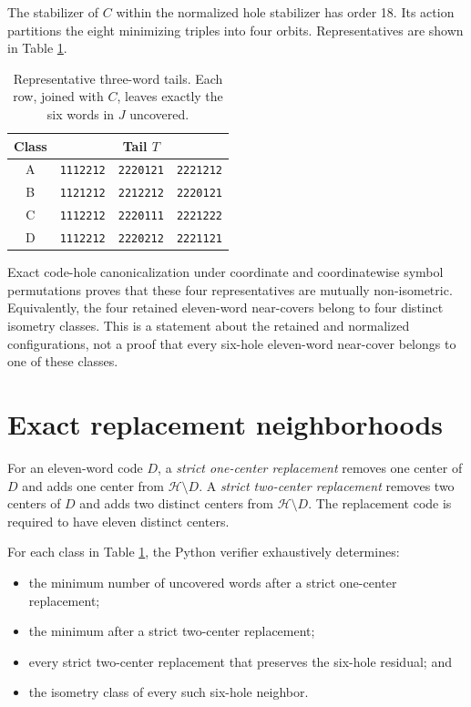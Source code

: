 \documentclass[11pt]{article}
\newcommand{\Hspace}{\mathcal{H}}
\newcommand{\codeword}[1]{\texttt{#1}}
\begin{document}
The stabilizer of \(C\) within the normalized hole stabilizer has order
18.  Its action partitions the eight minimizing triples into four
orbits.  Representatives are shown in Table \ref{tab:tails}.

\begin{table}[htbp]
\centering
\caption{Representative three-word tails.  Each row, joined with \(C\),
leaves exactly the six words in \(J\) uncovered.}
\label{tab:tails}
\begin{tabular}{c@{\qquad}lll}
\toprule
Class & \multicolumn{3}{c}{Tail \(T\)}\\
\midrule
A & \codeword{1112212} & \codeword{2220121} & \codeword{2221212}\\
B & \codeword{1121212} & \codeword{2212212} & \codeword{2220121}\\
C & \codeword{1112212} & \codeword{2220111} & \codeword{2221222}\\
D & \codeword{1112212} & \codeword{2220212} & \codeword{2221121}\\
\bottomrule
\end{tabular}
\end{table}

Exact code-hole canonicalization under coordinate and coordinatewise
symbol permutations proves that these four representatives are mutually
non-isometric.  Equivalently, the four retained eleven-word near-covers
belong to four distinct isometry classes.  This is a statement about the
retained and normalized configurations, not a proof that every
six-hole eleven-word near-cover belongs to one of these classes.

\section{Exact replacement neighborhoods}

For an eleven-word code \(D\), a \emph{strict one-center replacement}
removes one center of \(D\) and adds one center from
\(\Hspace\setminus D\).  A \emph{strict two-center replacement} removes
two centers of \(D\) and adds two distinct centers from
\(\Hspace\setminus D\).  The replacement code is required to have
eleven distinct centers.

For each class in Table \ref{tab:tails}, the Python verifier exhaustively
determines:

\begin{itemize}[leftmargin=2em]
  \item the minimum number of uncovered words after a strict one-center
        replacement;
  \item the minimum after a strict two-center replacement;
  \item every strict two-center replacement that preserves the
        six-hole residual; and
  \item the isometry class of every such six-hole neighbor.
\end{itemize}
\end{document}
